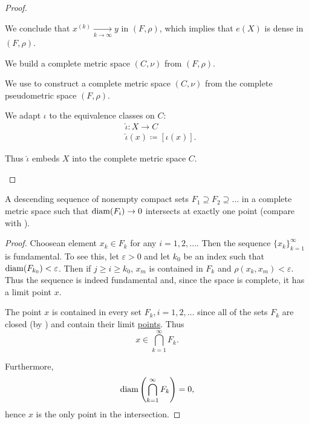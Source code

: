 \begin{proof}
\begin{defenum}
    We conclude that \( x^{(k)} \xrightarrow[k \to \infty]{} y \) in \( (F, \rho) \), which implies that \( e(X) \) is dense in \( (F, \rho) \).

     We build a complete metric space \( (C, \nu) \) from \( (F, \rho) \).

    We use  to construct a complete metric space \( (C, \nu) \) from the complete pseudometric space \( (F, \rho) \).

    We adapt \( \iota \) to the equivalence classes on \( C \):
    \begin{align*}
      &\hat\iota: X \to C \\
      &\hat\iota(x) \coloneqq [\iota(x)].
    \end{align*}

    Thus \( \hat\iota \) embeds \( X \) into the complete metric space \( C \).
  \end{defenum}
\end{proof}

\begin{theorem}\label{thm:cantors_nested_compact_theorem}
  A descending sequence of nonempty compact sets \( F_1 \supseteq F_2 \supseteq \ldots \) in a complete metric space such that \( \operatorname{diam}(F_i) \to 0 \) intersects at exactly one point (compare with ).
\end{theorem}
\begin{proof}
  Choose\AOC an element \( x_k \in F_k \) for any \( i = 1, 2, \ldots \). Then the sequence \( \{ x_k \}_{k=1}^\infty \) is fundamental. To see this, let \( \varepsilon > 0 \) and let \( k_0 \) be an index such that \( \operatorname{diam}(F_{k_0}) < \varepsilon \). Then if \( j \geq i \geq k_0 \), \( x_m \) is contained in \( F_k \) and \( \rho(x_k, x_m) < \varepsilon \). Thus the sequence is indeed fundamental and, since the space is complete, it has a limit point \( x \).

  The point \( x \) is contained in every set \( F_k, i = 1, 2, \ldots \) since all of the sets \( F_k \) are closed (by ) and contain their limit \hyperref[thm:limit_point_iff_in_closure]{points}. Thus
  \begin{equation*}
    x \in \bigcap_{k=1}^\infty F_k.
  \end{equation*}

  Furthermore,
  \begin{equation*}
    \operatorname{diam}\left( \bigcap_{k=1}^\infty F_k \right) = 0,
  \end{equation*}
  hence \( x \) is the only point in the intersection.
\end{proof}
